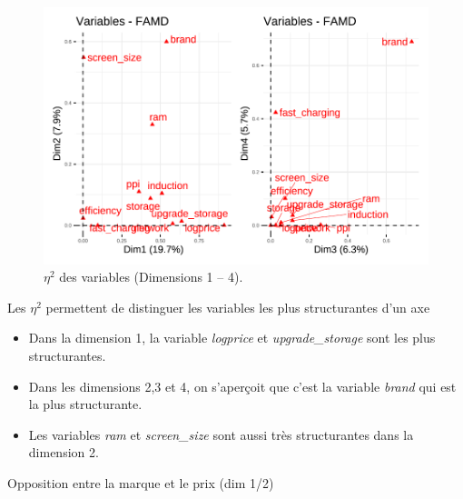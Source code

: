 \documentclass[
  12pt,
]{report}
\begin{document}
\begin{figure}[H]

{\centering \includegraphics{report_files/figure-pdf/unnamed-chunk-14-1.pdf}

}

\caption{\(\eta^2\) des variables (Dimensions 1 -- 4).}

\end{figure}%

\newpage

Les \(\eta^2\) permettent de distinguer les variables les plus
structurantes d'un axe

\begin{itemize}
\item
  Dans la dimension 1, la variable \emph{logprice} et
  \emph{upgrade\_storage} sont les plus structurantes.
\item
  Dans les dimensions 2,3 et 4, on s'aperçoit que c'est la variable
  \emph{brand} qui est la plus structurante.
\item
  Les variables \emph{ram} et \emph{screen\_size} sont aussi très
  structurantes dans la dimension 2.
\end{itemize}

Opposition entre la marque et le prix (dim 1/2)
\end{document}
